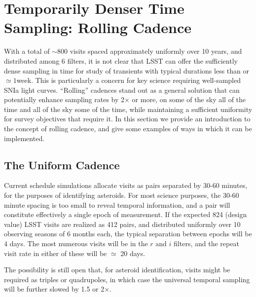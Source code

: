 %
%
%

\section{Temporarily Denser Time Sampling: Rolling Cadence}
\def\secname{rolling}\label{sec:\secname}


With a total of $\sim 800$ visits spaced approximately uniformly over 10
years, and distributed among 6 filters, it is not clear that LSST can
offer the sufficiently dense sampling in time for study of transients
with typical durations less than or $\simeq 1$week. This is particularly
a concern for key science requiring well-sampled SNIa light curves.
``Rolling'' cadences stand out as a general solution that can
potentially enhance sampling rates by 2$\times$ or more, on some of the
sky all of the time and all of the sky some of the time, while
maintaining a sufficient uniformity for survey objectives that require
it. In this section we provide an introduction to the concept of rolling
cadence, and give some examples of ways in which it can be implemented.


\subsection{The Uniform Cadence}

Current schedule simulations allocate visits as pairs separated by 30-60
minutes, for the purposes of identifying asteroids.  For most science
purposes, the 30-60 minute spacing is too small to reveal temporal
information, and a pair will constitute effectively a single epoch of
measurement.  If the expected 824 (design value) LSST visits are
realized as 412 pairs, and distributed uniformly over 10 observing
seasons of 6 months each, the typical separation between epochs will be
4 days.   The most numerous visits will be in the $r$ and $i$
filters, and the repeat visit rate in either of these will be $\simeq$
20 days.

The possibility is still open that, for asteroid identification, visits
might be required as triples or quadrupoles, in which case the universal
temporal sampling will be further slowed by 1.5 or 2$\times$.

